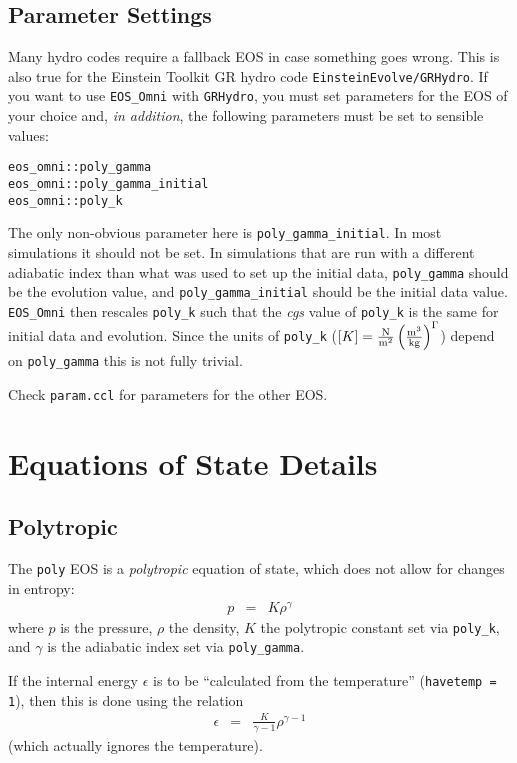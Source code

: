 \subsection{Parameter Settings}

Many hydro codes require a fallback EOS in case something goes
wrong. This is also true for the Einstein Toolkit GR hydro code
\texttt{EinsteinEvolve/GRHydro}. If you want to use \texttt{EOS\_Omni} with
\texttt{GRHydro}, you must set parameters for the EOS of your choice and,
\emph{in addition}, the following parameters must be set to sensible values:

\begin{verbatim}
eos_omni::poly_gamma 
eos_omni::poly_gamma_initial
eos_omni::poly_k 
\end{verbatim}

The only non-obvious parameter here is \texttt{poly\_gamma\_initial}.
In most simulations it should not be set.
In simulations that are run with a different adiabatic index than
what was used to set up the initial data, \texttt{poly\_gamma} should
be the evolution value, and \texttt{poly\_gamma\_initial} should be the
initial data value. \texttt{EOS\_Omni} then rescales \texttt{poly\_k} such
that the \emph{cgs} value of \texttt{poly\_k} is the same for initial data and
evolution. Since the units of \texttt{poly\_k}
($[K] = \frac{\rm N}{\rm m^2} \left(\frac{\rm m^3}{\rm kg}\right)^{\Gamma}$)
depend on \texttt{poly\_gamma} this is not fully trivial.

Check \texttt{param.ccl} for parameters for the other EOS.

\section{Equations of State Details}

\subsection{Polytropic}

The \texttt{poly} EOS is a \emph{polytropic} equation of state, which
does not allow for changes in entropy:
\begin{eqnarray}
  p & = & K \rho^\gamma
\end{eqnarray}
where $p$ is the pressure, $\rho$ the density, $K$ the polytropic
constant set via \texttt{poly\_k}, and $\gamma$ is the adiabatic index
set via \texttt{poly\_gamma}.

If the internal energy $\epsilon$ is to be ``calculated from the
temperature'' (\texttt{havetemp = 1}), then this is done using the
relation
\begin{eqnarray}
  \epsilon & = & \frac{K}{\gamma-1} \rho^{\gamma-1}
\label{eq:polyeps}
\end{eqnarray}
(which actually ignores the temperature).

